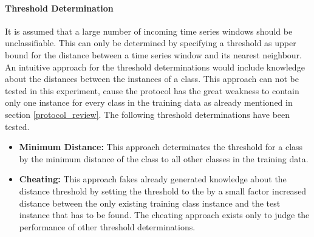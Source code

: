 \paragraph{Threshold Determination} \label{threshold_determination}
It is assumed that a large number of incoming time series windows should be unclassifiable. This can only be determined
by specifying a threshold as upper bound for the distance between a time series window and its nearest neighbour. An
intuitive approach for the threshold determinations would include knowledge about the distances between the instances of
a class. This approach can not be tested in this experiment, cause the protocol has the great weakness to contain only
one instance for every class in the training data as already mentioned in section \ref{protocol_review}. The following
threshold determinations have been tested.

\begin{itemize}
    \item \textbf{Minimum Distance:} This approach determinates the threshold for a class by the minimum distance of the
    class to all other classes in the training data.
    \item \textbf{Cheating:} This approach fakes already generated knowledge about the distance threshold by setting the
    threshold to the by a small factor increased distance between the only existing training class instance and the test
    instance that has to be found. The cheating approach exists only to judge the performance of other threshold
    determinations.
\end{itemize}
